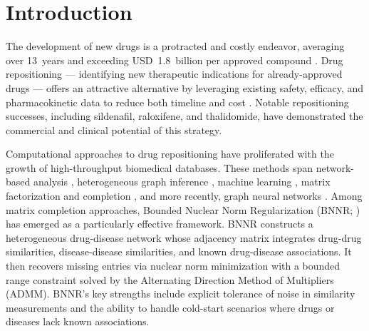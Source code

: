 \documentclass[unnumsec,webpdf,contemporary,large]{oup-authoring-template}
\begin{document}

\maketitle

\raggedend

\section{Introduction}
\label{sec:introduction}

The development of new drugs is a protracted and costly endeavor, averaging over 13~years and exceeding USD~1.8~billion per approved compound \citep{dimasi2003,paul2010}. Drug repositioning --- identifying new therapeutic indications for already-approved drugs --- offers an attractive alternative by leveraging existing safety, efficacy, and pharmacokinetic data to reduce both timeline and cost \citep{chong2007}. Notable repositioning successes, including sildenafil, raloxifene, and thalidomide, have demonstrated the commercial and clinical potential of this strategy.

Computational approaches to drug repositioning have proliferated with the growth of high-throughput biomedical databases. These methods span network-based analysis \citep{martinez2015,wang2013}, heterogeneous graph inference \citep{wang2014}, machine learning \citep{gottlieb2011}, matrix factorization and completion \citep{candes2009,dai2015,luo2018,yang2019,mongia2022}, and more recently, graph neural networks \citep{fu2022,gao2023,meng2022}. Among matrix completion approaches, Bounded Nuclear Norm Regularization (BNNR; \citet{yang2019}) has emerged as a particularly effective framework. BNNR constructs a heterogeneous drug-disease network whose adjacency matrix integrates drug-drug similarities, disease-disease similarities, and known drug-disease associations. It then recovers missing entries via nuclear norm minimization with a bounded range constraint solved by the Alternating Direction Method of Multipliers (ADMM). BNNR's key strengths include explicit tolerance of noise in similarity measurements and the ability to handle cold-start scenarios where drugs or diseases lack known associations.
\end{document}
